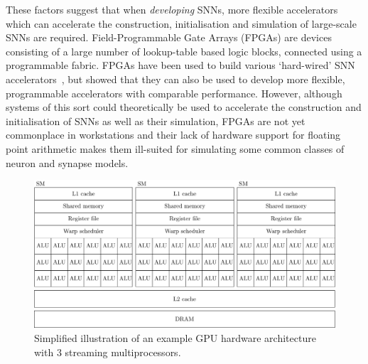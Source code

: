 \documentclass[utf8]{frontiersSCNS} %
\begin{document}
These factors suggest that when \textit{developing} SNNs, more flexible accelerators which can accelerate the construction, initialisation and simulation of large-scale SNNs are required.
Field-Programmable Gate Arrays (FPGAs) are devices consisting of a large number of lookup-table based logic blocks, connected using a programmable fabric.
FPGAs have been used to build various `hard-wired' SNN accelerators~\citep{Moore2012,Wang2018}, but \citet{Naylor2013} showed that they can also be used to develop more flexible, programmable accelerators with comparable performance.
However, although systems of this sort could theoretically be used to accelerate the construction and initialisation of SNNs as well as their simulation, FPGAs are not yet commonplace in workstations and their lack of hardware support for floating point arithmetic makes them ill-suited for simulating some common classes of neuron and synapse models. 

\begin{figure}
    \begin{center}
        \includegraphics{figures/gpu}
    \end{center}
    \caption{Simplified illustration of an example GPU hardware architecture with 3 streaming multiprocessors.}
    \label{fig:gpu}
\end{figure}
\end{document}
